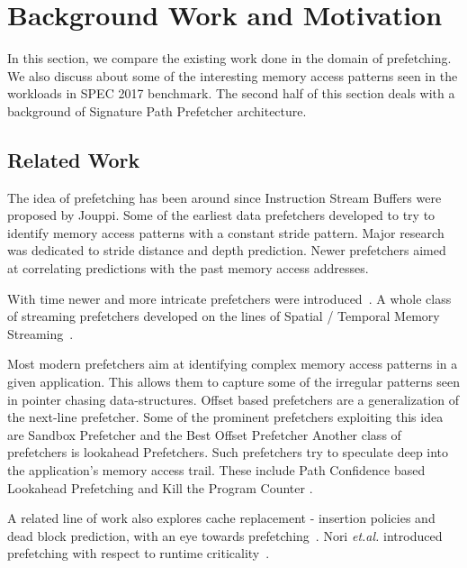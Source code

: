 \section{Background Work and Motivation}

In this section, we compare the existing work done in the domain of
prefetching.  We also discuss about some of the interesting memory
access patterns seen in the workloads in SPEC 2017 benchmark.  The
second half of this section deals with a background of Signature Path
Prefetcher architecture.

\subsection{Related Work}

The idea of prefetching has been around since Instruction Stream
Buffers were proposed by Jouppi.  \cite{ISB} Some of the earliest data
prefetchers developed to try to identify memory access patterns with a
constant stride pattern.  \cite{Smith,Baer,Stride} Major research was
dedicated to stride distance and depth prediction.
\cite{Decoupled,Adaptive} Newer prefetchers aimed at correlating
predictions with the past memory access addresses.
\cite{Address_Correlated,AMPM}

With time newer and more intricate prefetchers were
introduced~\cite{Wenisch_Temporal_Streaming,Stealth,Feedback_Directed,Coordinated,Bandwidth_Efficient,Pacman,TLB,Linearizing,Sandbox,VLDP,DoL,Domino}.
A whole class of streaming prefetchers developed on the lines of
Spatial / Temporal Memory
Streaming~\cite{Spatial_Pattern,SMS,Temporal_Instruction_Fetch,Off_Chip,STMS,SMS_JILP}.

Most modern prefetchers aim at identifying complex memory access
patterns in a given application.  This allows them to capture some of
the irregular patterns seen in pointer chasing data-structures.
Offset based prefetchers are a generalization of the next-line
prefetcher.  Some of the prominent prefetchers exploiting this idea
are Sandbox Prefetcher \cite{Sandbox} and the Best Offset Prefetcher
\cite{BOP} Another class of prefetchers is lookahead Prefetchers.
Such prefetchers try to speculate deep into the application's memory
access trail.  These include Path Confidence based Lookahead
Prefetching \cite{SPP} and Kill the Program Counter \cite{KPC}.

A related line of work also explores cache replacement - insertion
policies and dead block prediction, with an eye towards
prefetching~\cite{DB_Pred,Cache_Burst,KPC,Harmony}.  Nori
\textit{et.al.} introduced prefetching with respect to runtime
criticality~\cite{CATCH}.


